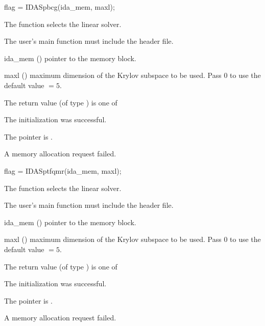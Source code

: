{
  flag = IDASpbcg(ida\_mem, maxl);
}
{
  The function  selects the {\idaspbcg} linear solver. 

  The user's main function must include the  header file.
}
{
  \begin{args}
  \item[ida\_mem] ()
    pointer to the {\ida} memory block.
  \item[maxl] ()
    maximum dimension of the Krylov subspace to be used. Pass $0$ to use the 
    default value $=5$.
  \end{args}
}
{
  The return value  (of type ) is one of
  \begin{args}
  \item[\Id{IDASPBCG\_SUCCESS}] 
    The {\idaspbcg} initialization was successful.
  \item[\Id{IDASPBCG\_MEM\_NULL}]
    The  pointer is .
  \item[\Id{IDASPBCG\_MEM\_FAIL}]
    A memory allocation request failed.
  \end{args}
}
{}
{
  flag = IDASptfqmr(ida\_mem, maxl);
}
{
  The function  selects the {\idasptfqmr} linear solver. 

  The user's main function must include the  header file.
}
{
  \begin{args}
  \item[ida\_mem] ()
    pointer to the {\ida} memory block.
  \item[maxl] ()
    maximum dimension of the Krylov subspace to be used. Pass $0$ to use the 
    default value $=5$.
  \end{args}
}
{
  The return value  (of type ) is one of
  \begin{args}
  \item[\Id{IDASPTFQMR\_SUCCESS}] 
    The {\idasptfqmr} initialization was successful.
  \item[\Id{IDASPTFQMR\_MEM\_NULL}]
    The  pointer is .
  \item[\Id{IDASPTFQMR\_MEM\_FAIL}]
    A memory allocation request failed.
  \end{args}
}
{}

